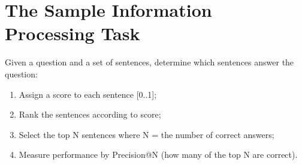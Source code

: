 \section{The Sample Information Processing Task}

Given a question and a set of sentences, determine which sentences answer the question:
\begin{enumerate}
  \item Assign a score to each sentence [0..1];
  \item Rank the sentences according to score;
  \item Select the top N sentences where N = the number of correct answers;
  \item Measure performance by Precision@N (how many of the top N are correct).
\end{enumerate}


